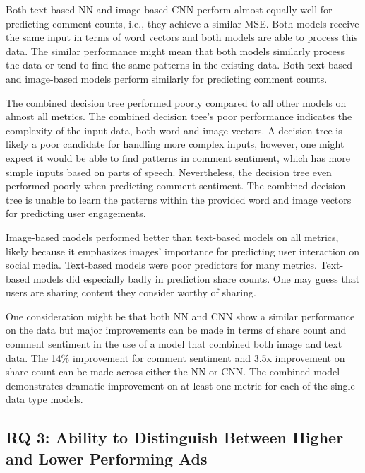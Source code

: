 \documentclass[mksc,blindrev]{informs3} %
\begin{document}
Both text-based NN and image-based CNN perform almost equally well for predicting comment counts, i.e., they achieve a similar MSE. Both models receive the same input in terms of word vectors and both models are able to process this data. The similar performance might mean that both models similarly process the data or tend to find the same patterns in the existing data. Both text-based and image-based models perform similarly for predicting comment counts.

The combined decision tree performed poorly compared to all other models on almost all metrics. The combined decision tree's poor performance indicates the complexity of the input data, both word and image vectors. A decision tree is likely a poor candidate for handling more complex inputs, however, one might expect it would be able to find patterns in comment sentiment, which has more simple inputs based on parts of speech. Nevertheless, the decision tree even performed poorly when predicting comment sentiment. The combined decision tree is unable to learn the patterns within the provided word and image vectors for predicting user engagements.

Image-based models performed better than text-based models on all metrics, likely because it emphasizes images' importance for predicting user interaction on social media. Text-based models were poor predictors for many metrics. Text-based models did especially badly in prediction share counts. One may guess that users are sharing content they consider worthy of sharing.

One consideration might be that both NN and CNN show a similar performance on the data but major improvements can be made in terms of share count and comment sentiment in the use of a model that combined both image and text data. The 14\% improvement for comment sentiment and 3.5x improvement on share count can be made across either the NN or CNN. The combined model demonstrates dramatic  improvement on at least one metric for each of the single-data type models.

\subsection{RQ 3: Ability to Distinguish Between Higher and Lower Performing Ads}
\end{document}
